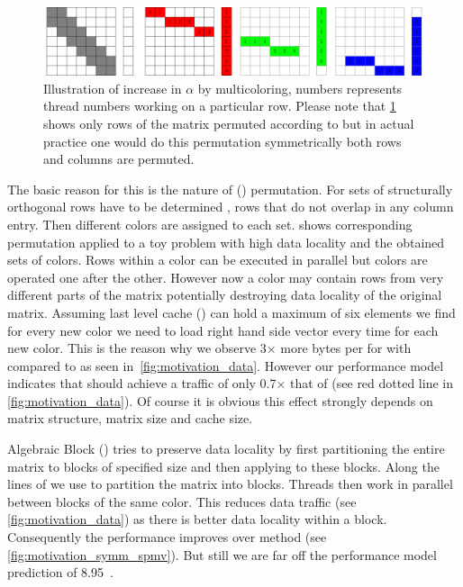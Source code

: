   \begin{figure}[htbp]
  	\centering
  	\includegraphics[scale=0.45]{pics/mc_alpha_problem/mc_alpha_unsymm}
  	\caption{Illustration of increase in $\alpha$ by multicoloring, numbers represents thread numbers working on a particular row. Please note that \cref{fig:mc_alpha} shows only rows of the matrix permuted according to \MCfull but in actual practice one would do this permutation symmetrically \ie both rows and columns are permuted.}
  	\label{fig:mc_alpha}
  \end{figure}
  
  The basic reason for this is the nature of \MCfull (\MC) permutation. For \DTWO \MC sets of structurally orthogonal rows have to be determined \cite{dist_k_def}, \ie rows that do not overlap in any column entry. Then different colors are assigned to each set.  shows corresponding permutation applied to a toy problem with high data locality and the obtained sets of colors. Rows within a color can be executed in parallel but colors are operated one after the other. However now a color may contain rows from very different parts of the matrix potentially destroying data locality of the original matrix.  Assuming last level cache (\LLC) can hold a maximum of six elements we find for every new color we need to load right hand side vector every time for each new color. This is the reason why we observe 3$\times$ more bytes per \nnz for \SymmSpmv with \MC compared to \SpMV as seen in~\cref{fig:motivation_data}.  However our performance model indicates that \SymmSpmv should achieve a traffic of only 0.7$\times$ that of \SpMV (see red dotted line in \cref{fig:motivation_data}). Of course it is obvious this effect strongly depends on matrix structure, matrix size and cache size. 
      
  
  Algebraic Block \MCfull (\ABMC) tries to preserve data locality by first partitioning the entire matrix to blocks of specified size and then applying \MCfull to these blocks. Along the lines of \cite{Park_HPCG} we use \METIS \cite{METIS} to partition the matrix into blocks. Threads then work in parallel between blocks of the same color. This reduces data traffic (see \cref{fig:motivation_data}) as there is better data locality within a block. Consequently the performance improves over \MC method (see \cref{fig:motivation_symm_spmv}). But still we are far off the performance model prediction of 8.95~\GF.
  
